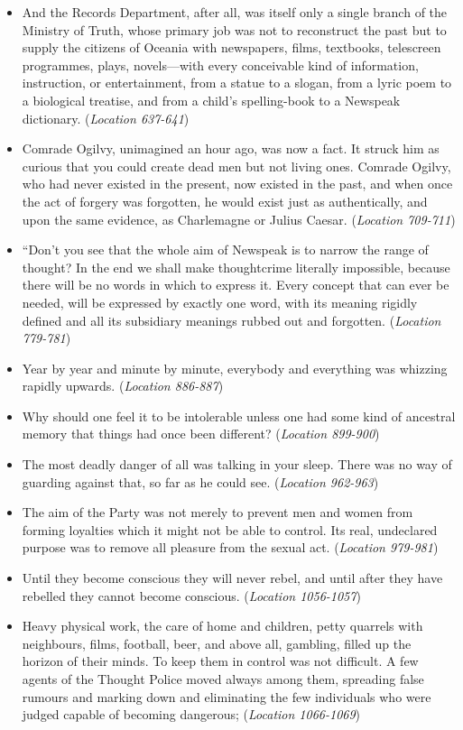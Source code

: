 \documentclass[12pt]{article}
\begin{document}
\begin{itemize}
\item {And the Records Department, after all, was itself only a single branch of the Ministry of Truth, whose primary job was not to reconstruct the past but to supply the citizens of Oceania with newspapers, films, textbooks, telescreen programmes, plays, novels—with every conceivable kind of information, instruction, or entertainment, from a statue to a slogan, from a lyric poem to a biological treatise, and from a child’s spelling-book to a Newspeak dictionary. (\textit{Location 637-641})}
\item {Comrade Ogilvy, unimagined an hour ago, was now a fact. It struck him as curious that you could create dead men but not living ones. Comrade Ogilvy, who had never existed in the present, now existed in the past, and when once the act of forgery was forgotten, he would exist just as authentically, and upon the same evidence, as Charlemagne or Julius Caesar. (\textit{Location 709-711})}
\item {“Don’t you see that the whole aim of Newspeak is to narrow the range of thought? In the end we shall make thoughtcrime literally impossible, because there will be no words in which to express it. Every concept that can ever be needed, will be expressed by exactly one word, with its meaning rigidly defined and all its subsidiary meanings rubbed out and forgotten. (\textit{Location 779-781})}
\item {Year by year and minute by minute, everybody and everything was whizzing rapidly upwards. (\textit{Location 886-887})}
\item {Why should one feel it to be intolerable unless one had some kind of ancestral memory that things had once been different? (\textit{Location 899-900})}
\item {The most deadly danger of all was talking in your sleep. There was no way of guarding against that, so far as he could see. (\textit{Location 962-963})}
\item {The aim of the Party was not merely to prevent men and women from forming loyalties which it might not be able to control. Its real, undeclared purpose was to remove all pleasure from the sexual act. (\textit{Location 979-981})}
\item {Until they become conscious they will never rebel, and until after they have rebelled they cannot become conscious. (\textit{Location 1056-1057})}
\item {Heavy physical work, the care of home and children, petty quarrels with neighbours, films, football, beer, and above all, gambling, filled up the horizon of their minds. To keep them in control was not difficult. A few agents of the Thought Police moved always among them, spreading false rumours and marking down and eliminating the few individuals who were judged capable of becoming dangerous; (\textit{Location 1066-1069})}

\end{itemize}
\end{document}
